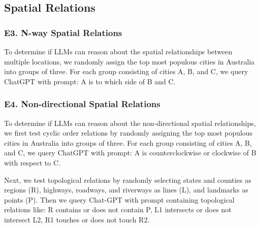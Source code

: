 \subsection{Spatial Relations} %

\subsubsection{E3. N-way Spatial Relations}
To determine if LLMs can reason about the spatial relationships between multiple locations, we randomly assign the top  most populous cities in Australia into  groups of three.
For each group consisting of cities A, B, and C, we query ChatGPT with prompt: A is to which side of B and C. 


\subsubsection{E4. Non-directional Spatial Relations}
To determine if LLMs can reason about the non-directional spatial relationships, we first test cyclic order relations by randomly assigning the top  most populous cities in Australia into  groups of three.
For each group consisting of cities A, B, and C, we query ChatGPT with prompt: A is counterclockwise or clockwise of B with respect to C.

Next, we test topological relations by randomly selecting states and counties as regions (R), highways, roadways, and riverways as lines (L), and landmarks as points (P).
Then we query Chat-GPT with prompt containing topological relations like: R contains or does not contain P, L1 intersects or does not intersect L2, R1 touches or does not touch R2. 


